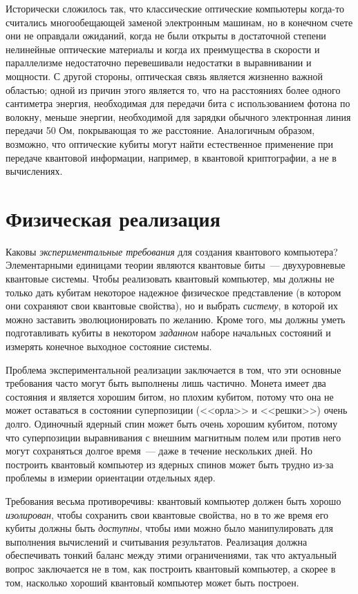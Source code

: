 \begin{multicols}{2}
{        Исторически сложилось так, что классические оптические компьютеры когда-то считались многообещающей заменой электронным машинам, но в конечном счете они не оправдали ожиданий, когда не были открыты в достаточной степени нелинейные оптические материалы и когда их преимущества в скорости и параллелизме недостаточно перевешивали недостатки в выравнивании и мощности. С другой стороны, оптическая связь является жизненно важной областью; одной из причин этого является то, что на расстояниях более одного сантиметра энергия, необходимая для передачи бита с использованием фотона по волокну, меньше энергии, необходимой для зарядки обычного
        электронная линия передачи 50 Ом, покрывающая то же расстояние. Аналогичным образом, возможно, что оптические кубиты могут найти естественное применение при передаче квантовой информации, например, в квантовой криптографии, а не в вычислениях.
    }\\
    \section*{Физическая реализация}
    \normalsize{
    Каковы \emph{экспериментальные требования} для создания квантового компьютера? Элементарными единицами теории являются квантовые биты~--– двухуровневые квантовые системы.
    Чтобы реализовать квантовый компьютер, мы должны не только дать кубитам некоторое надежное физическое представление (в котором они сохраняют свои квантовые свойства), но
    и выбрать \emph{систему}, в которой их можно заставить эволюционировать по желанию. Кроме того, мы
    должны уметь подготавливать кубиты в некотором \emph{заданном} наборе начальных состояний и измерять
    конечное выходное состояние системы.

    Проблема экспериментальной реализации заключается в том, что эти основные требования часто могут
    быть выполнены лишь частично. Монета имеет два состояния и является хорошим битом, но плохим кубитом, потому что она не может оставаться в состоянии суперпозиции (<<орла>> и <<решки>>) очень долго.
    Одиночный ядерный спин может быть очень хорошим кубитом, потому что суперпозиции выравнивания
    с внешним магнитным полем или против него могут сохраняться долгое время~--– даже в течение нескольких дней. Но
    построить квантовый компьютер из ядерных спинов может быть трудно из-за проблемы в измерии ориентации отдельных ядер.
    
    Требования весьма противоречивы: квантовый компьютер должен быть
    хорошо \emph{изолирован}, чтобы сохранить свои квантовые свойства, но в то же время его кубиты
    должны быть \emph{доступны}, чтобы ими можно было манипулировать для выполнения вычислений и
    считывания результатов. Реализация должна обеспечивать тонкий баланс между
    этими ограничениями, так что актуальный вопрос заключается не в том, как построить квантовый компьютер,
    а скорее в том, насколько хороший квантовый компьютер может быть построен.
    }\\

\end{multicols}
